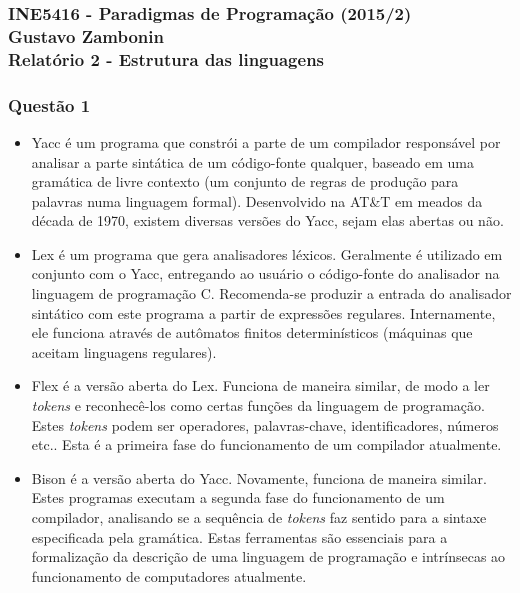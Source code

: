 \documentclass{article}
\begin{document}
\subsubsection*{INE5416 - Paradigmas de Programação (2015/2) \\
    Gustavo Zambonin \\
    Relatório 2 - Estrutura das linguagens
}

\subsubsection*{Questão 1}
\begin{itemize}
    \item Yacc é um programa que constrói a parte de um compilador responsável por analisar a parte sintática de um código-fonte qualquer, baseado em uma gramática de livre contexto (um conjunto de regras de produção para palavras numa linguagem formal). Desenvolvido na AT\&T em meados da década de 1970, existem diversas versões do Yacc, sejam elas abertas ou não.

    \item Lex é um programa que gera analisadores léxicos. Geralmente é utilizado em conjunto com o Yacc, entregando ao usuário o código-fonte do analisador na linguagem de programação C. Recomenda-se produzir a entrada do analisador sintático com este programa a partir de expressões regulares. Internamente, ele funciona através de autômatos finitos determinísticos (máquinas que aceitam linguagens regulares).

    \item Flex é a versão aberta do Lex. Funciona de maneira similar, de modo a ler \textit{tokens} e reconhecê-los como certas funções da linguagem de programação. Estes \textit{tokens} podem ser operadores, palavras-chave, identificadores, números etc.. Esta é a primeira fase do funcionamento de um compilador atualmente.

    \item Bison é a versão aberta do Yacc. Novamente, funciona de maneira similar. Estes programas executam a segunda fase do funcionamento de um compilador, analisando se a sequência de \textit{tokens} faz sentido para a sintaxe especificada pela gramática. Estas ferramentas são essenciais para a formalização da descrição de uma linguagem de programação e intrínsecas ao funcionamento de computadores atualmente.
\end{itemize}
\end{document}
